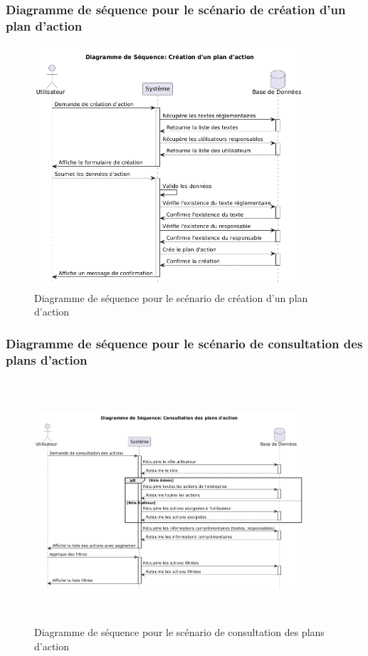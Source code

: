 \subsubsection{Diagramme de séquence pour le scénario de création d'un plan d'action}
\begin{figure}[H]
    \centering
    \includegraphics[width=10cm,height=9cm]{images/createactionseq.png}
    \caption{Diagramme de séquence pour le scénario de création d'un plan d'action}
\end{figure}

\subsubsection{Diagramme de séquence pour le scénario de consultation des plans d'action}
\begin{figure}[H]
    \centering
    \includegraphics[width=10cm,height=9cm]{images/consultactionseq.png}
    \caption{Diagramme de séquence pour le scénario de consultation des plans d'action}
\end{figure}

